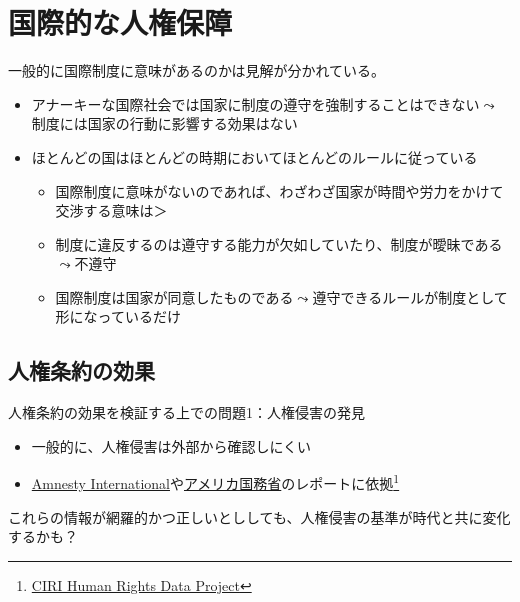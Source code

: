 \documentclass[
  xelatex,
  ja=standard]{bxjsarticle}
\providecommand{\tightlist}{%
  \setlength{\itemsep}{0pt}\setlength{\parskip}{0pt}}\usepackage{longtable,booktabs,array}
\begin{document}
\hypertarget{ux56fdux969bux7684ux306aux4ebaux6a29ux4fddux969c}{%
\section{国際的な人権保障}\label{ux56fdux969bux7684ux306aux4ebaux6a29ux4fddux969c}}

一般的に国際制度に意味があるのかは見解が分かれている。

\begin{itemize}
\tightlist
\item
  アナーキーな国際社会では国家に制度の遵守を強制することはできない\(\leadsto\)制度には国家の行動に影響する効果はない\citep{mearsheimer2017}
\item
  ほとんどの国はほとんどの時期においてほとんどのルールに従っている\citep{henkin1979}

  \begin{itemize}
  \tightlist
  \item
    国際制度に意味がないのであれば、わざわざ国家が時間や労力をかけて交渉する意味は＞
  \item
    制度に違反するのは遵守する能力が欠如していたり、制度が曖昧である\(\leadsto\)不遵守\citep{chayes1993}
  \item
    国際制度は国家が同意したものである\(\leadsto\)遵守できるルールが制度として形になっているだけ\citep{downs1996}
  \end{itemize}
\end{itemize}

\hypertarget{ux4ebaux6a29ux6761ux7d04ux306eux52b9ux679c}{%
\subsection{人権条約の効果}\label{ux4ebaux6a29ux6761ux7d04ux306eux52b9ux679c}}

人権条約の効果を検証する上での問題1：人権侵害の発見

\begin{itemize}
\tightlist
\item
  一般的に、人権侵害は外部から確認しにくい
\item
  \href{https://www.amnesty.or.jp/}{Amnesty
  International}や\href{https://jp.usembassy.gov/ja/category/reports-ja/}{アメリカ国務省}のレポートに依拠\footnote{\href{http://www.humanrightsdata.com/}{CIRI
    Human Rights Data Project}}
\end{itemize}

これらの情報が網羅的かつ正しいとししても、人権侵害の基準が時代と共に変化するかも？
\end{document}
